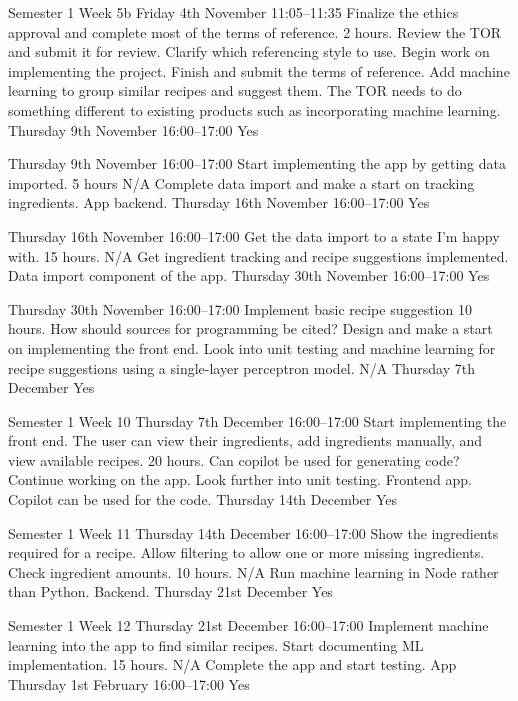 \documentclass[../CHEFCookingHelperForEveryonesFridge.tex]{subfiles}
\begin{document}
\logbookentry
{Semester 1 Week 5b}
{Friday 4th November 11:05--11:35}
{Finalize the ethics approval and complete most of the terms of reference.}
{2 hours.}
{Review the TOR and submit it for review. Clarify which referencing style to use. Begin work on implementing the project.}
{Finish and submit the terms of reference. Add machine learning to group similar recipes and suggest them.}
{The TOR needs to do something different to existing products such as incorporating machine learning.}
{Thursday 9th November 16:00--17:00}
{Yes}

{Thursday 9th November 16:00--17:00}
{Start implementing the app by getting data imported.}
{5 hours}
{N/A}
{Complete data import and make a start on tracking ingredients.}
{App backend.}
{Thursday 16th November 16:00--17:00}
{Yes}

{Thursday 16th November 16:00--17:00}
{Get the data import to a state I'm happy with.}
{15 hours.}
{N/A}
{Get ingredient tracking and recipe suggestions implemented.}
{Data import component of the app.}
{Thursday 30th November 16:00--17:00}
{Yes}

{Thursday 30th November 16:00--17:00}
{Implement basic recipe suggestion}
{10 hours.}
{How should sources for programming be cited?}
{Design and make a start on implementing the front end. Look into unit testing and machine learning for recipe suggestions using a single-layer perceptron model.}
{N/A}
{Thursday 7th December}
{Yes}

\logbookentry
{Semester 1 Week 10}
{Thursday 7th December 16:00--17:00}
{Start implementing the front end. The user can view their ingredients, add ingredients manually, and view available recipes.}
{20 hours.}
{Can copilot be used for generating code?}
{Continue working on the app. Look further into unit testing.}
{Frontend app. Copilot can be used for the code.}
{Thursday 14th December}
{Yes}

\logbookentry
{Semester 1 Week 11}
{Thursday 14th December 16:00--17:00}
{Show the ingredients required for a recipe. Allow filtering to allow one or more missing ingredients. Check ingredient amounts.}
{10 hours.}
{N/A}
{Run machine learning in Node rather than Python.}
{Backend.}
{Thursday 21st December}
{Yes}

\logbookentry
{Semester 1 Week 12}
{Thursday 21st December 16:00--17:00}
{Implement machine learning into the app to find similar recipes. Start documenting ML implementation.}
{15 hours.}
{N/A}
{Complete the app and start testing.}
{App}
{Thursday 1st February 16:00--17:00}
{Yes}
\end{document}
